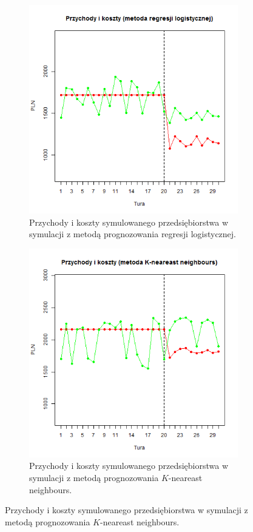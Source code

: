 \documentclass[polish, twoside, 12pt, a4paper]{article}
\theoremstyle{definition}
\theoremstyle{plain}
\theoremstyle{remark}
\begin{document}
\begin{figure}[hbt]
  \centering
  \begin{subfigure}[t]{0.6\textwidth}
    \includegraphics[width=\textwidth]{pictures/przychody_koszty_lm.png}
    \caption{Przychody i koszty symulowanego przedsiębiorstwa w symulacji z metodą prognozowania regresji logistycznej.}
    \label{fig:przychod_koszt}
  \end{subfigure}
  \hfill
  \begin{subfigure}[t]{0.6\textwidth}

    \includegraphics[width=\textwidth]{pictures/przcyhody_koszty_kn.png}
    \caption{Przychody i koszty symulowanego przedsiębiorstwa w symulacji z metodą prognozowania $K$-neareast neighbours.}
    \label{fig:zysk}
  \end{subfigure}
  

\end{figure}
\end{document}
